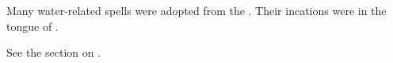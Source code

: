 \begin{gloss}
  
  
  
  
  
  
  
  
  
  \begin{comment}
    \paragraph{Imetric magic}
  \end{comment}
  
  
  
  
  
  
  
  
  
  
  \begin{comment}
    \paragraph{Naga magic}
  \end{comment}
  Many water-related spells were adopted from the \nagae. 
  Their incations were in the tongue of .
  
  
  
  
  
  
  
  
  
  \begin{comment}\paragraph{\QuilJaaran magic}\end{comment}
  See the section on .
  
  
  
  
  
  
  
  
  
  \begin{comment}
    \paragraph{\Rethyactic magic}
  \end{comment}
  
  
  
  
  
  
  
  
  

\end{gloss}
